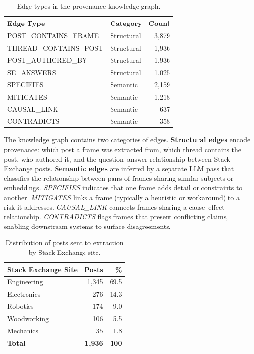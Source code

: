 \begin{table}[t]
\caption{Edge types in the provenance knowledge graph.}
\label{tab:edge-types}
\centering
\begin{tabular}{llr}
\toprule
Edge Type & Category & Count \\
\midrule
POST\_CONTAINS\_FRAME   & Structural & 3{,}879 \\
THREAD\_CONTAINS\_POST  & Structural & 1{,}936 \\
POST\_AUTHORED\_BY      & Structural & 1{,}936 \\
SE\_ANSWERS             & Structural & 1{,}025 \\
\addlinespace
SPECIFIES               & Semantic   & 2{,}159 \\
MITIGATES               & Semantic   & 1{,}218 \\
CAUSAL\_LINK            & Semantic   &   637 \\
CONTRADICTS             & Semantic   &   358 \\
\bottomrule
\end{tabular}
\end{table}

The knowledge graph contains two categories of edges.
\textbf{Structural edges} encode provenance: which post a frame was
extracted from, which thread contains the post, who authored it, and
the question--answer relationship between Stack Exchange posts.
\textbf{Semantic edges} are inferred by a separate LLM pass that
classifies the relationship between pairs of frames sharing similar
subjects or embeddings.  \emph{SPECIFIES} indicates that one frame
adds detail or constraints to another.  \emph{MITIGATES} links a
frame (typically a heuristic or workaround) to a risk it addresses.
\emph{CAUSAL\_LINK} connects frames sharing a cause--effect
relationship.  \emph{CONTRADICTS} flags frames that present
conflicting claims, enabling downstream systems to surface
disagreements.


\begin{table}[t]
\caption{Distribution of posts sent to extraction by Stack Exchange site.}
\label{tab:source-sites}
\centering
\begin{tabular}{lrr}
\toprule
Stack Exchange Site & Posts & \% \\
\midrule
Engineering        & 1{,}345 & 69.5 \\
Electronics        &   276   & 14.3 \\
Robotics           &   174   &  9.0 \\
Woodworking        &   106   &  5.5 \\
Mechanics          &    35   &  1.8 \\
\addlinespace
\textbf{Total}     & \textbf{1{,}936} & \textbf{100} \\
\bottomrule
\end{tabular}
\end{table}

